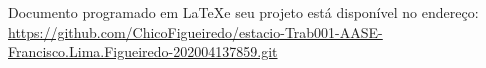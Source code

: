 
%
\begin{anexosenv}

\partanexos

Documento programado em \LaTeX  e seu projeto está disponível no endereço: \\ \href{https://github.com/ChicoFigueiredo/estacio-Trab001-AASE-Francisco.Lima.Figueiredo-202004137859.git}{https://github.com/ChicoFigueiredo/estacio-Trab001-AASE-Francisco.Lima.Figueiredo-202004137859.git}\\


\end{anexosenv}
